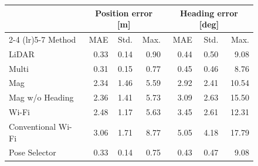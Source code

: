 \begin{figure}[!t]
  \centering

\begin{minipage}{\columnwidth}
  \centering
  \label{tab:path1_localization_error}
  \scriptsize
  \setlength{\tabcolsep}{3.8pt}
  \renewcommand{\arraystretch}{1.08}
  \small

  \begin{tabular}{lrrrrrr}
    \toprule
    &
    \multicolumn{3}{c}{Position error [m]} &
    \multicolumn{3}{c}{Heading error [deg]} \\
    \cmidrule(lr){2-4}
    \cmidrule(lr){5-7}
    Method &
    MAE & Std. & Max. &
    MAE & Std. & Max. \\
    \midrule
    LiDAR
      & 0.33 & 0.14 & 0.90
      & 0.44 & 0.50 & 9.08 \\
    Multi
      & 0.31 & 0.15 & 0.77
      & 0.45 & 0.46 & 8.76 \\
    Mag
      & 2.34 & 1.46 & 5.59
      & 2.92 & 2.41 & 10.54 \\
    Mag w/o Heading
      & 2.36 & 1.41 & 5.73
      & 3.09 & 2.63 & 15.50 \\
    Wi-Fi
      & 2.48 & 1.17 & 5.63
      & 3.45 & 2.61 & 12.31 \\
    Conventional Wi-Fi
      & 3.06 & 1.71 & 8.77
      & 5.05 & 4.18 & 17.79 \\
    Pose Selector
      & 0.33 & 0.14 & 0.75
      & 0.43 & 0.47 & 9.08 \\
    \bottomrule
  \end{tabular}
\end{minipage}

  \vspace{1.2em}

\begin{minipage}{\columnwidth}
  \centering
  \label{tab:path2_localization_error}
  \scriptsize
  \setlength{\tabcolsep}{3.8pt}
  \renewcommand{\arraystretch}{1.08}
  \small


\end{minipage}
\end{figure}

